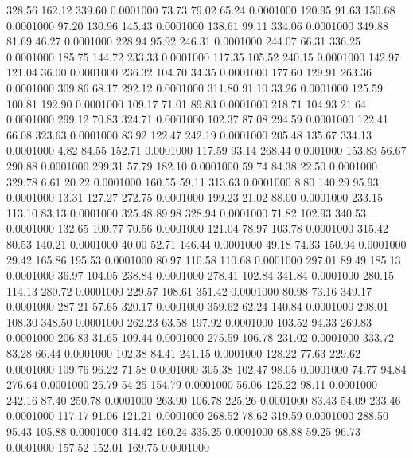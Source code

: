  328.56  162.12  339.60   0.0001000
  73.73   79.02   65.24   0.0001000
 120.95   91.63  150.68   0.0001000
  97.20  130.96  145.43   0.0001000
 138.61   99.11  334.06   0.0001000
 349.88   81.69   46.27   0.0001000
 228.94   95.92  246.31   0.0001000
 244.07   66.31  336.25   0.0001000
 185.75  144.72  233.33   0.0001000
 117.35  105.52  240.15   0.0001000
 142.97  121.04   36.00   0.0001000
 236.32  104.70   34.35   0.0001000
 177.60  129.91  263.36   0.0001000
 309.86   68.17  292.12   0.0001000
 311.80   91.10   33.26   0.0001000
 125.59  100.81  192.90   0.0001000
 109.17   71.01   89.83   0.0001000
 218.71  104.93   21.64   0.0001000
 299.12   70.83  324.71   0.0001000
 102.37   87.08  294.59   0.0001000
 122.41   66.08  323.63   0.0001000
  83.92  122.47  242.19   0.0001000
 205.48  135.67  334.13   0.0001000
   4.82   84.55  152.71   0.0001000
 117.59   93.14  268.44   0.0001000
 153.83   56.67  290.88   0.0001000
 299.31   57.79  182.10   0.0001000
  59.74   84.38   22.50   0.0001000
 329.78    6.61   20.22   0.0001000
 160.55   59.11  313.63   0.0001000
   8.80  140.29   95.93   0.0001000
  13.31  127.27  272.75   0.0001000
 199.23   21.02   88.00   0.0001000
 233.15  113.10   83.13   0.0001000
 325.48   89.98  328.94   0.0001000
  71.82  102.93  340.53   0.0001000
 132.65  100.77   70.56   0.0001000
 121.04   78.97  103.78   0.0001000
 315.42   80.53  140.21   0.0001000
  40.00   52.71  146.44   0.0001000
  49.18   74.33  150.94   0.0001000
  29.42  165.86  195.53   0.0001000
  80.97  110.58  110.68   0.0001000
 297.01   89.49  185.13   0.0001000
  36.97  104.05  238.84   0.0001000
 278.41  102.84  341.84   0.0001000
 280.15  114.13  280.72   0.0001000
 229.57  108.61  351.42   0.0001000
  80.98   73.16  349.17   0.0001000
 287.21   57.65  320.17   0.0001000
 359.62   62.24  140.84   0.0001000
 298.01  108.30  348.50   0.0001000
 262.23   63.58  197.92   0.0001000
 103.52   94.33  269.83   0.0001000
 206.83   31.65  109.44   0.0001000
 275.59  106.78  231.02   0.0001000
 333.72   83.28   66.44   0.0001000
 102.38   84.41  241.15   0.0001000
 128.22   77.63  229.62   0.0001000
 109.76   96.22   71.58   0.0001000
 305.38  102.47   98.05   0.0001000
  74.77   94.84  276.64   0.0001000
  25.79   54.25  154.79   0.0001000
  56.06  125.22   98.11   0.0001000
 242.16   87.40  250.78   0.0001000
 263.90  106.78  225.26   0.0001000
  83.43   54.09  233.46   0.0001000
 117.17   91.06  121.21   0.0001000
 268.52   78.62  319.59   0.0001000
 288.50   95.43  105.88   0.0001000
 314.42  160.24  335.25   0.0001000
  68.88   59.25   96.73   0.0001000
 157.52  152.01  169.75   0.0001000
